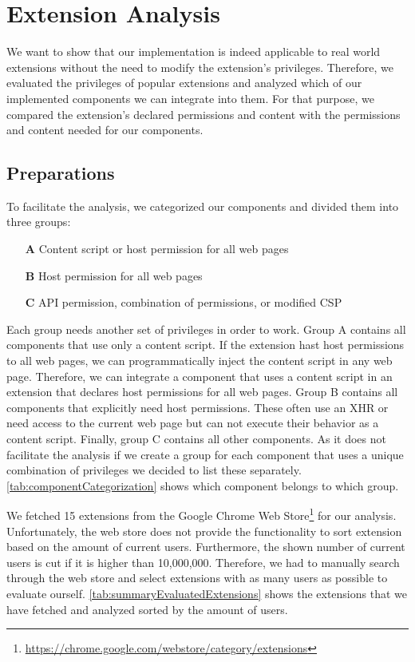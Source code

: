 
\chapter{Extension Analysis}
\label{chp:extensionAnalysis}
	
	We want to show that our implementation is indeed applicable to real world extensions without the need to modify the extension's privileges. Therefore, we evaluated the privileges of popular extensions and analyzed which of our implemented components we can integrate into them. For that purpose, we compared the extension's declared permissions and content with the permissions and content needed for our components. 
	
\section{Preparations}

	To facilitate the analysis, we categorized our components and divided them into three groups:

	\begin{itemize}[nosep]
		\item[\textbf{A}] Content script or host permission for all web pages
		\item[\textbf{B}] Host permission for all web pages
		\item[\textbf{C}] API permission, combination of permissions, or modified CSP
	\end{itemize}
	
	Each group needs another set of privileges in order to work. Group A contains all components that use only a content script. If the extension hast host permissions to all web pages, we can programmatically inject the content script in any web page. Therefore, we can integrate a component that uses a content script in an extension that declares host permissions for all web pages. Group B contains all components that explicitly need host permissions. These often use an XHR or need access to the current web page but can not execute their behavior as a content script. Finally, group C contains all other components. As it does not facilitate the analysis if we create a group for each component that uses a unique combination of privileges we decided to list these separately. \autoref{tab:componentCategorization} shows which component belongs to which group. 
	
	We fetched 15 extensions from the Google Chrome Web Store\footnote{\url{https://chrome.google.com/webstore/category/extensions}} for our analysis. Unfortunately, the web store does not provide the functionality to sort extension based on the amount of current users. Furthermore, the shown number of current users is cut if it is higher than 10,000,000. Therefore, we had to manually search through the web store and select extensions with as many users as possible to evaluate ourself. \autoref{tab:summaryEvaluatedExtensions} shows the extensions that we have fetched and analyzed sorted by the amount of users. %
	
